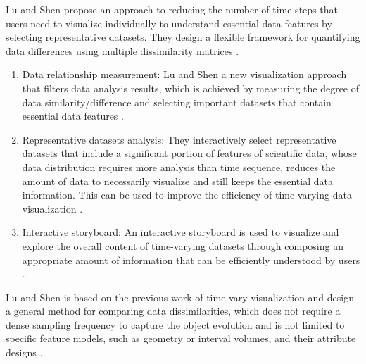 \documentclass{egpubl}
\begin{document}
Lu and Shen propose an approach to reducing the number of time
steps that users need to visualize individually to understand essential data features by selecting representative datasets. They design a flexible framework for quantifying data differences using multiple dissimilarity matrices \cite{lu2008interactive}.
\begin{enumerate}
\item Data relationship measurement: Lu and Shen \cite{lu2008interactive} a new visualization approach that filters data analysis results, which is achieved by measuring the
degree of data similarity/difference and selecting important datasets that contain essential data features \cite{lu2008interactive}. 
\item Representative datasets analysis: They interactively select representative
datasets that include a significant portion of features of scientific data, whose data distribution requires more analysis than time
sequence, reduces the amount of data to necessarily visualize and still keeps the essential data information. This can be used to improve the efficiency of time-varying data visualization \cite{lu2008interactive}.
\item Interactive storyboard: An interactive storyboard is used to visualize and explore the overall content of time-varying datasets through composing an appropriate amount of information that can be efficiently understood by users \cite{lu2008interactive}. 
\end{enumerate}
Lu and Shen is based on the previous work of time-vary visualization \cite{hansen2011visualization} and design a general method for comparing data dissimilarities, which does not require a dense sampling frequency to capture the object evolution and is not limited to specific feature models, such as geometry or interval volumes, and their attribute designs \cite{lu2008interactive}. 
\end{document}
